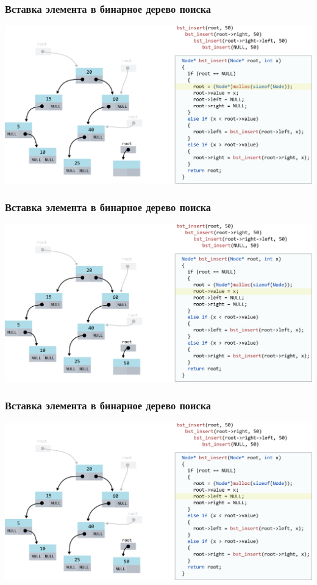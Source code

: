 \documentclass[10pt,pdf,hyperref={unicode}]{beamer}
\begin{document}
\begin{frame}[fragile]
\frametitle{Вставка элемента в бинарное дерево поиска}
\begin{center}
\includegraphics[scale=0.6]{images/tree/codetree/codetree12.png}
\end{center}
\end{frame}
\begin{frame}[fragile]
\frametitle{Вставка элемента в бинарное дерево поиска}
\begin{center}
\includegraphics[scale=0.6]{images/tree/codetree/codetree13.png}
\end{center}
\end{frame}
\begin{frame}[fragile]
\frametitle{Вставка элемента в бинарное дерево поиска}
\begin{center}
\includegraphics[scale=0.6]{images/tree/codetree/codetree14.png}
\end{center}
\end{frame}
\end{document}
